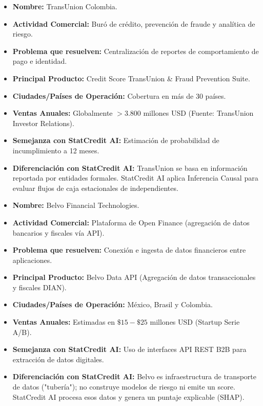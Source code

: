 \documentclass[11pt,a4paper]{article}
\begin{document}
\begin{tcolorbox}[title=2. Competidor: TransUnion Colombia]
\begin{itemize}[leftmargin=*, noitemsep]
    \item \textbf{Nombre:} TransUnion Colombia.
    \item \textbf{Actividad Comercial:} Buró de crédito, prevención de fraude y analítica de riesgo.
    \item \textbf{Problema que resuelven:} Centralización de reportes de comportamiento de pago e identidad.
    \item \textbf{Principal Producto:} Credit Score TransUnion \& Fraud Prevention Suite.
    \item \textbf{Ciudades/Países de Operación:} Cobertura en más de 30 países.
    \item \textbf{Ventas Anuales:} Globalmente $>3.800$ millones USD (Fuente: TransUnion Investor Relations).
    \item \textbf{Semejanza con StatCredit AI:} Estimación de probabilidad de incumplimiento a 12 meses.
    \item \textbf{Diferenciación con StatCredit AI:} TransUnion se basa en información reportada por entidades formales. StatCredit AI aplica Inferencia Causal para evaluar flujos de caja estacionales de independientes.
\end{itemize}
\end{tcolorbox}

\begin{tcolorbox}[title=3. Competidor: Belvo]
\begin{itemize}[leftmargin=*, noitemsep]
    \item \textbf{Nombre:} Belvo Financial Technologies.
    \item \textbf{Actividad Comercial:} Plataforma de Open Finance (agregación de datos bancarios y fiscales vía API).
    \item \textbf{Problema que resuelven:} Conexión e ingesta de datos financieros entre aplicaciones.
    \item \textbf{Principal Producto:} Belvo Data API (Agregación de datos transaccionales y fiscales DIAN).
    \item \textbf{Ciudades/Países de Operación:} México, Brasil y Colombia.
    \item \textbf{Ventas Anuales:} Estimadas en $\$15 - \$25$ millones USD (Startup Serie A/B).
    \item \textbf{Semejanza con StatCredit AI:} Uso de interfaces API REST B2B para extracción de datos digitales.
    \item \textbf{Diferenciación con StatCredit AI:} Belvo es infraestructura de transporte de datos ("tubería"); no construye modelos de riesgo ni emite un score. StatCredit AI procesa esos datos y genera un puntaje explicable (SHAP).
\end{itemize}
\end{tcolorbox}
\end{document}
